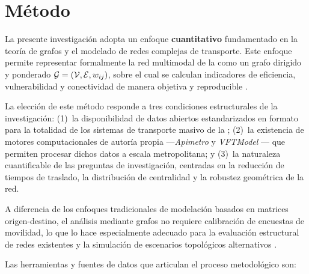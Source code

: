 \section{Método}
\label{sec:metodo}

La presente investigación adopta un enfoque \textbf{cuantitativo}
fundamentado en la teoría de grafos y el modelado de redes complejas de transporte.
Este enfoque permite representar formalmente la red multimodal de la \zmvm{} como
un grafo dirigido y ponderado $\mathcal{G} = (\mathcal{V}, \mathcal{E}, w_{ij})$, sobre el
cual se calculan indicadores de eficiencia, vulnerabilidad y conectividad de manera
objetiva y reproducible \parencite{allauca2023, owais2020}.

La elección de este método responde a tres condiciones estructurales de la
investigación: (1)~la disponibilidad de datos abiertos estandarizados en formato
\gtfs{} para la totalidad de los sistemas de transporte masivo de la \cdmx{};
(2)~la existencia de motores computacionales de autoría propia ---\textit{Apimetro}
\parencite{cabrera2025apimetro} y \textit{VFTModel} \parencite{cabrera2026VFTModel}---
que permiten procesar dichos datos a escala metropolitana; y (3)~la naturaleza
cuantificable de las preguntas de investigación, centradas en la reducción de tiempos
de traslado, la distribución de centralidad y la robustez geométrica de la red.

A diferencia de los enfoques tradicionales de modelación basados en matrices
origen-destino, el análisis mediante grafos no requiere calibración de encuestas de
movilidad, lo que lo hace especialmente adecuado para la evaluación estructural de
redes existentes y la simulación de escenarios topológicos alternativos
\parencite{fortin2016innovative}.

Las herramientas y fuentes de datos que articulan el proceso metodológico son:


